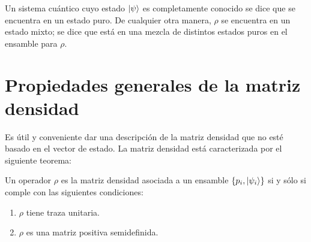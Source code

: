 \documentclass[12pt]{report}
\begin{document}
Un sistema cuántico cuyo estado $\ket{\psi}$ es completamente conocido se dice que se encuentra en
un estado puro. De cualquier otra manera, $\rho$ se encuentra en un estado mixto; se dice que está
en una mezcla de distintos estados puros en el ensamble para $\rho$. \newpage

\section{Propiedades generales de la matriz densidad}
Es útil y conveniente dar una descripción de la matriz densidad que no esté basado en el vector de
estado. La matriz densidad está caracterizada por el siguiente teorema: 
\begin{teorema}
Un operador $\rho$ es la matriz densidad asociada a un ensamble $\{p_i, \ket{\psi _i} \}$ si y
sólo si comple con las siguientes condiciones:
\begin{enumerate}
\item $\rho$ tiene traza unitaria.
\item $\rho$ es una matriz positiva semidefinida. 
\end{enumerate}	
\end{teorema}
\end{document}
